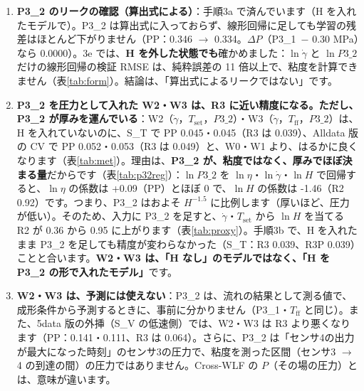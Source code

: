 \documentclass[paper=a4paper,fontsize=10.5pt,line_length=44zw,number_of_lines=38]{jlreq}
\newcommand{\gd}{\dot{\gamma}}
\newcommand{\Tff}{T_{\mathrm{ff}}}
\newcommand{\Tset}{T_{\mathrm{set}}}
\newcommand{\PI}{P3\_1}
\newcommand{\PII}{P3\_2}
\begin{document}
\begin{enumerate}[itemsep=0.6ex,topsep=0.6ex]
\item \textbf{P3\_2 のリークの確認（算出式による）}：手順3a で済んでいます（H を入れたモデルで）。P3\_2 は算出式に入っておらず、線形回帰に足しても学習の残差はほとんど下がりません（PP：0.346 $\to$ 0.334。$\Delta P$（\PI\ $-$ 0.30 MPa）なら 0.0000）。3e では、\textbf{H を外した状態でも}確かめました：$\ln\gd$ と $\ln\PII$ だけの線形回帰の検証 RMSE は、純粋誤差の 11 倍以上で、粘度を計算できません（表\ref{tab:form}）。結論は、「算出式によるリークではない」です。
\item \textbf{P3\_2 を圧力として入れた W2・W3 は、R3 に近い精度になる。ただし、P3\_2 が厚みを運んでいる}：W2（$\gd$，$\Tset$，$\PII$）・W3（$\gd$，$\Tff$，$\PII$）は、H を入れていないのに、S\_T で PP 0.045・0.045（R3 は 0.039）、Alldata 版の CV で PP 0.052・0.053（R3 は 0.049）と、W0・W1 より、はるかに良くなります（表\ref{tab:met}）。理由は、\textbf{P3\_2 が、粘度ではなく、厚みでほぼ決まる量}だからです（表\ref{tab:p32reg}）：$\ln\PII$ を $\ln\eta$・$\ln\gd$・$\ln H$ で回帰すると、$\ln\eta$ の係数は +0.09（PP）とほぼ 0 で、$\ln H$ の係数は -1.46（R2 0.92）です。つまり、P3\_2 はおよそ $H^{-1.5}$ に比例します（厚いほど、圧力が低い）。そのため、入力に P3\_2 を足すと、$\gd$・$\Tset$ から $\ln H$ を当てる R2 が 0.36 から 0.95 に上がります（表\ref{tab:proxy}）。手順3b で、H を入れたまま P3\_2 を足しても精度が変わらなかった（S\_T：R3 0.039、R3P 0.039）ことと合います。\textbf{W2・W3 は、「H なし」のモデルではなく、「H を P3\_2 の形で入れたモデル」}です。
\item \textbf{W2・W3 は、予測には使えない}：P3\_2 は、流れの結果として測る値で、成形条件から予測するときに、事前に分かりません（P3\_1・$\Tff$ と同じ）。また、5data 版の外挿（S\_V の低速側）では、W2・W3 は R3 より悪くなります（PP：0.141・0.111、R3 は 0.064）。さらに、P3\_2 は「センサ4の出力が最大になった時刻」のセンサ3の圧力で、粘度を測った区間（センサ3 $\to$ 4 の到達の間）の圧力ではありません。Cross-WLF の $P$（その場の圧力）とは、意味が違います。
\end{enumerate}
\end{document}
